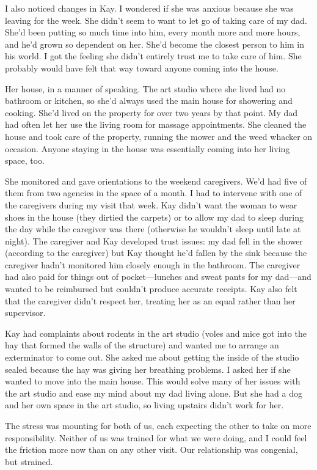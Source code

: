 \documentclass[12pt]{book}
\begin{document}
I also noticed changes in Kay. I wondered if she was anxious because she was leaving for the week. She didn't seem to want to let go of taking care of my dad. She'd been putting so much time into him, every month more and more hours, and he'd grown so dependent on her. She'd become the closest person to him in his world. I got the feeling she didn't entirely trust me to take care of him. She probably would have felt that way toward anyone coming into the house.

Her house, in a manner of speaking. The art studio where she lived had no bathroom or kitchen, so she'd always used the main house for showering and cooking. She'd lived on the property for over two years by that point. My dad had often let her use the living room for massage appointments. She cleaned the house and took care of the property, running the mower and the weed whacker on occasion. Anyone staying in the house was essentially coming into her living space, too.

She monitored and gave orientations to the weekend caregivers. We'd had five of them from two agencies in the space of a month. I had to intervene with one of the caregivers during my visit that week. Kay didn't want the woman to wear shoes in the house (they dirtied the carpets) or to allow my dad to sleep during the day while the caregiver was there (otherwise he wouldn't sleep until late at night). The caregiver and Kay developed trust issues: my dad fell in the shower (according to the caregiver) but Kay thought he'd fallen by the sink because the caregiver hadn't monitored him closely enough in the bathroom. The caregiver had also paid for things out of pocket---lunches and sweat pants for my dad---and wanted to be reimbursed but couldn't produce accurate receipts. Kay also felt that the caregiver didn't respect her, treating her as an equal rather than her supervisor.

Kay had complaints about rodents in the art studio (voles and mice got into the hay that formed the walls of the structure) and wanted me to arrange an exterminator to come out. She asked me about getting the inside of the studio sealed because the hay was giving her breathing problems. I asked her if she wanted to move into the main house. This would solve many of her issues with the art studio and ease my mind about my dad living alone. But she had a dog and her own space in the art studio, so living upstairs didn't work for her.

The stress was mounting for both of us, each expecting the other to take on more responsibility. Neither of us was trained for what we were doing, and I could feel the friction more now than on any other visit. Our relationship was congenial, but strained.
\end{document}
